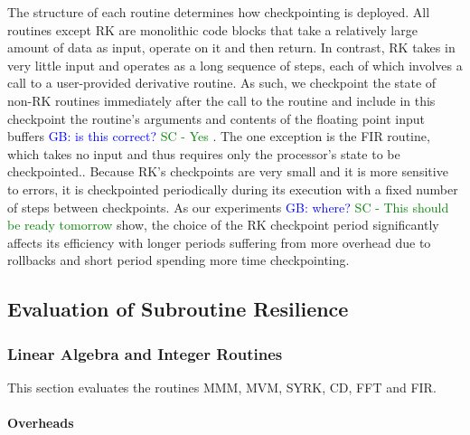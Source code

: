 \documentclass{sig-alternate}
\newcommand{\sui}[1]{%
  \textcolor{green}{SC - #1}
}
\newcommand{\greg}[1]{%
  \textcolor{blue}{GB: #1}
}
\begin{document}
The structure of each routine determines how checkpointing is deployed.
All routines except RK are monolithic code blocks that take a relatively large amount of data as input, operate on it and then return.
In contrast, RK takes in very little input and operates as a long sequence of steps, each of which involves a call to a user-provided derivative routine.
As such, we checkpoint the state of non-RK routines immediately after the call to the routine and include in this checkpoint the routine's arguments and contents of the floating point input buffers \greg{is this correct?} \sui{Yes}.
The one exception is the FIR routine, which takes no input and thus requires only the processor's state to be checkpointed..
Because RK's checkpoints are very small and it is more sensitive to errors, it is checkpointed periodically during its execution with a fixed number of steps between checkpoints.
As our experiments \greg{where?} \sui{This should be ready tomorrow} show, the choice of the RK checkpoint period significantly affects its efficiency with longer periods suffering from more overhead due to rollbacks and short period spending more time checkpointing.

\subsection{Evaluation of Subroutine Resilience}
\label{sec:res_tech:eval}

\subsubsection{Linear Algebra and Integer Routines}
\label{sec:res_tech:eval:la_int}

This section evaluates the routines MMM, MVM, SYRK, CD, FFT and FIR.

\paragraph{Overheads}
\end{document}

